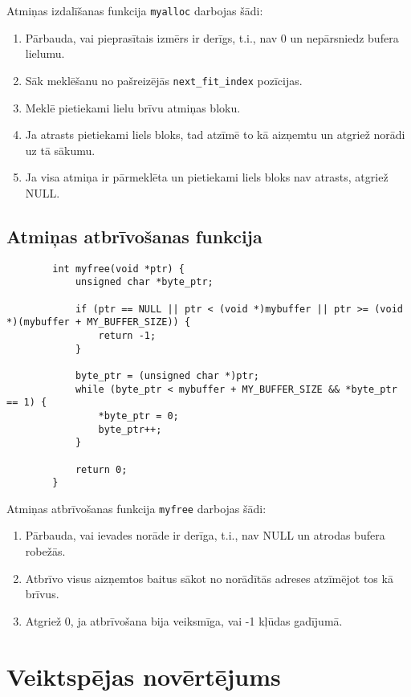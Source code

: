 \documentclass{article}
\begin{document}
	Atmiņas izdalīšanas funkcija \texttt{myalloc} darbojas šādi:
	
	\begin{enumerate}
		\item Pārbauda, vai pieprasītais izmērs ir derīgs, t.i., nav 0 un nepārsniedz bufera lielumu.
		\item Sāk meklēšanu no pašreizējās \texttt{next\_fit\_index} pozīcijas.
		\item Meklē pietiekami lielu brīvu atmiņas bloku.
		\item Ja atrasts pietiekami liels bloks, tad atzīmē to kā aizņemtu un atgriež norādi uz tā sākumu.
		\item Ja visa atmiņa ir pārmeklēta un pietiekami liels bloks nav atrasts, atgriež NULL.
	\end{enumerate}
	
	\subsection{Atmiņas atbrīvošanas funkcija}
	
	\begin{verbatim}
		int myfree(void *ptr) {
			unsigned char *byte_ptr;
			
			if (ptr == NULL || ptr < (void *)mybuffer || ptr >= (void *)(mybuffer + MY_BUFFER_SIZE)) {
				return -1;
			}
			
			byte_ptr = (unsigned char *)ptr;
			while (byte_ptr < mybuffer + MY_BUFFER_SIZE && *byte_ptr == 1) {
				*byte_ptr = 0;
				byte_ptr++;
			}
			
			return 0;
		}
	\end{verbatim}
	
	Atmiņas atbrīvošanas funkcija \texttt{myfree} darbojas šādi:
	
	\begin{enumerate}
		\item Pārbauda, vai ievades norāde ir derīga, t.i., nav NULL un atrodas bufera robežās.
		\item Atbrīvo visus aizņemtos baitus sākot no norādītās adreses atzīmējot tos kā brīvus.
		\item Atgriež 0, ja atbrīvošana bija veiksmīga, vai -1 kļūdas gadījumā.
	\end{enumerate}
	
	\section{Veiktspējas novērtējums}
	
\end{document}
